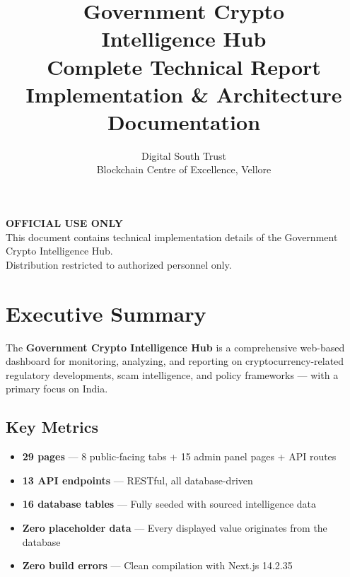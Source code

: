 \documentclass[12pt,a4paper]{article}
\title{\Huge\textbf{Government Crypto\\Intelligence Hub}\\[0.5em]
\Large Complete Technical Report\\[0.3em]
\normalsize Implementation \& Architecture Documentation}
\author{\large Digital South Trust\\Blockchain Centre of Excellence, Vellore}
\begin{document}
\maketitle
\thispagestyle{empty}

\begin{center}
\begin{tcolorbox}[width=0.85\textwidth,colback=navy!5!white,colframe=navy!80!black,title=\textbf{Classification}]
\centering
\textbf{OFFICIAL USE ONLY}\\[0.3em]
This document contains technical implementation details of the Government Crypto Intelligence Hub.\\
Distribution restricted to authorized personnel only.
\end{tcolorbox}
\end{center}


\newpage
\tableofcontents
\newpage

\section{Executive Summary}

The \textbf{Government Crypto Intelligence Hub} is a comprehensive web-based dashboard for monitoring, analyzing, and reporting on cryptocurrency-related regulatory developments, scam intelligence, and policy frameworks — with a primary focus on India.

\subsection*{Key Metrics}
\begin{itemize}[nosep]
    \item \textbf{29 pages} — 8 public-facing tabs + 15 admin panel pages + API routes
    \item \textbf{13 API endpoints} — RESTful, all database-driven
    \item \textbf{16 database tables} — Fully seeded with sourced intelligence data
    \item \textbf{Zero placeholder data} — Every displayed value originates from the database
    \item \textbf{Zero build errors} — Clean compilation with Next.js 14.2.35
\end{itemize}
\end{document}
